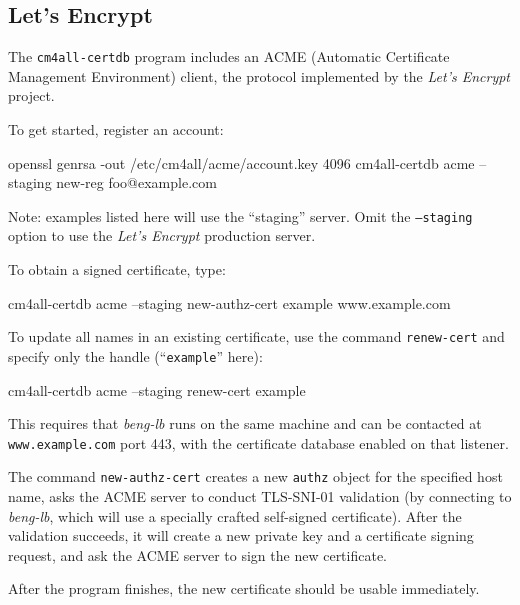 \documentclass[a4paper,12pt]{article}
\begin{document}
\subsection{Let's Encrypt}

The \texttt{cm4all-certdb} program includes an ACME (Automatic
Certificate Management Environment) client, the protocol implemented
by the \emph{Let's Encrypt} project.

To get started, register an account:

\begin{verbatim*}
openssl genrsa -out /etc/cm4all/acme/account.key  4096
cm4all-certdb acme --staging new-reg foo@example.com
\end{verbatim*}

\small{Note: examples listed here will use the ``staging'' server.
  Omit the \texttt{--staging} option to use the \emph{Let's Encrypt}
  production server.}

To obtain a signed certificate, type:

\begin{verbatim*}
cm4all-certdb acme --staging new-authz-cert example www.example.com
\end{verbatim*}

To update all names in an existing certificate, use the command
\texttt{renew-cert} and specify only the handle (``\texttt{example}''
here):

\begin{verbatim*}
cm4all-certdb acme --staging renew-cert example
\end{verbatim*}

This requires that \emph{beng-lb} runs on the same machine and can be
contacted at \texttt{www.example.com} port 443, with the certificate
database enabled on that listener.

The command \texttt{new-authz-cert} creates a new \texttt{authz}
object for the specified host name, asks the ACME server to conduct
TLS-SNI-01 validation (by connecting to \emph{beng-lb}, which will use
a specially crafted self-signed certificate).  After the validation
succeeds, it will create a new private key and a certificate signing
request, and ask the ACME server to sign the new certificate.

After the program finishes, the new certificate should be usable
immediately.
\end{document}
